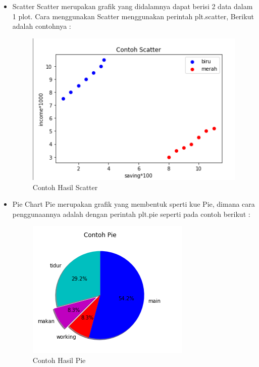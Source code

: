 \begin{itemize}	
	\item Scatter\newline
	Scatter merupakan grafik yang didalamnya dapat berisi 2 data dalam 1 plot.\newline
	Cara menggunakan Scatter menggunakan perintah plt.scatter, Berikut adalah contohnya :

	

\begin{figure}[h]
\centering
\includegraphics[scale=0.5]{figures/6/Teori/1174025/no3sc.png}
\caption{Contoh Hasil Scatter}
\label{fig:contoh}
\end{figure}
\end{itemize}

\begin{itemize}
	\item Pie\newline
	Chart Pie merupakan grafik yang membentuk sperti kue Pie, dimana cara penggunaannya adalah dengan perintah
	plt.pie seperti pada contoh berikut :
	
	

\begin{figure}[h]
\centering
\includegraphics[scale=0.6]{figures/6/Teori/1174025/no3pie.png}
\caption{Contoh Hasil Pie}
\label{fig:contoh Pie}
\end{figure}


\end{itemize}

